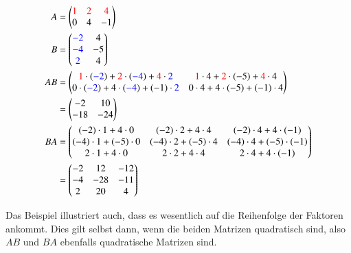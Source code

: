 \begin{beispiel}
\begin{align*}
A&=\begin{pmatrix}
\color{red}1&\color{red}2&\color{red}4\\
0&4&-1
\end{pmatrix}
\\
B&=\begin{pmatrix}
\color{blue}-2&4\\
\color{blue}-4&-5\\
\color{blue}2&4
\end{pmatrix}
\\
AB&=
\begin{pmatrix}
{\color{red}1}\cdot({\color{blue}-2})+{\color{red}2}\cdot({\color{blue}-4})+{\color{red}4}\cdot{\color{blue}2} &
{\color{red}1}\cdot 4+{\color{red}2}\cdot(-5)+{\color{red}4}\cdot 4\\
0\cdot ({\color{blue}-2})+4\cdot({\color{blue}-4})+(-1)\cdot {\color{blue}2} &
0\cdot 4+4\cdot(-5)+(-1)\cdot 4
\end{pmatrix}
\\
&=
\begin{pmatrix}
-2&10\\-18&-24
\end{pmatrix}
\\
BA&=\begin{pmatrix}
(-2)\cdot1+4\cdot 0&
(-2)\cdot2+4\cdot 4&
(-2)\cdot4+4\cdot (-1) \\
(-4)\cdot1+(-5)\cdot 0&
(-4)\cdot2+(-5)\cdot 4&
(-4)\cdot4+(-5)\cdot (-1)\\
2\cdot1+ 4\cdot0&
2\cdot2+ 4\cdot4&
2\cdot4+ 4\cdot (-1)
\end{pmatrix}
\\
&=
\begin{pmatrix}
   -2&  12& -12\\
   -4& -28& -11\\
    2&  20&   4
\end{pmatrix}
\end{align*}
\end{beispiel}
Das Beispiel illustriert auch, dass es wesentlich auf die Reihenfolge
der Faktoren ankommt. Dies gilt selbst dann, wenn die beiden
Matrizen quadratisch sind, also $AB$ und $BA$ ebenfalls quadratische
Matrizen sind.
